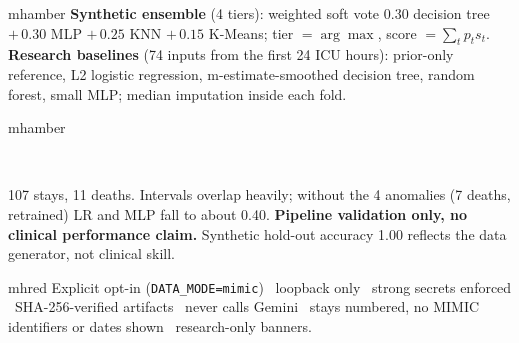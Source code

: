 \documentclass[11pt]{article}
\begin{document}
\begin{minipage}[t]{0.245\linewidth}\vspace{0pt}
\begin{pbox}[Models]{mhamber}
\textbf{Synthetic ensemble} (4 tiers): weighted soft vote $0.30$ decision tree $+\,0.30$ MLP
$+\,0.25$ KNN $+\,0.15$ K-Means; tier $=\arg\max$, score $=\sum_t p_t s_t$.\\[1mm]
\textbf{Research baselines} (74 inputs from the first 24 ICU hours): prior-only reference, L2 logistic
regression, m-estimate-smoothed decision tree, random forest, small MLP; median imputation inside each fold.
\end{pbox}
\begin{pbox}{mhamber}
\centering
{}\\[1mm]
\raggedright
\small 107 stays, 11 deaths. Intervals overlap heavily; without the 4 anomalies (7 deaths, retrained)
LR and MLP fall to about 0.40. \textbf{Pipeline validation only, no clinical performance claim.}
Synthetic hold-out accuracy 1.00 reflects the data generator, not clinical skill.
\end{pbox}
\begin{pbox}{mhred}
Explicit opt-in (\texttt{DATA\_MODE=mimic}) \textbullet\ loopback only \textbullet\ strong secrets
enforced \textbullet\ SHA-256-verified artifacts \textbullet\ never calls Gemini \textbullet\ stays numbered,
no MIMIC identifiers or dates shown \textbullet\ research-only banners.
\end{pbox}
\end{minipage}\hfill
\end{document}
